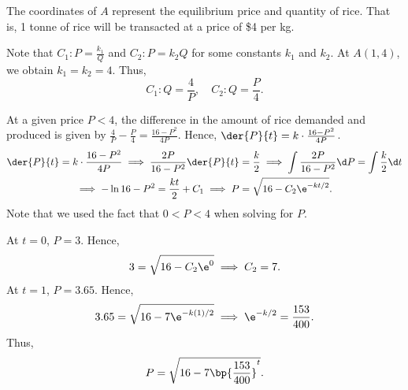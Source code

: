 \begin{solution}
    \begin{ppart}
        The coordinates of $A$ represent the equilibrium price and quantity of rice. That is, 1 tonne of rice will be transacted at a price of \$4 per kg.
    \end{ppart}
    \begin{ppart}
        Note that $C_1: P = \frac{k_1}{Q}$ and $C_2: P = k_2 Q$ for some constants $k_1$ and $k_2$. At $A(1, 4)$, we obtain $k_1 = k_2 = 4$. Thus, \[C_1 : Q = \frac4P, \quad C_2 : Q = \frac{P}{4}.\]
    \end{ppart}
    \begin{ppart}
        At a given price $P < 4$, the difference in the amount of rice demanded and produced is given by $\frac{4}{P} - \frac{P}{4} = \frac{16 - P^2}{4P}$. Hence, $\der{P}{t} = k \cdot \frac{16 - P^2}{4P}$.
        \begin{gather*}
            \der{P}{t} = k \cdot \frac{16 - P^2}{4P} \implies \frac{2P}{16 - P^2} \der{P}{t} = \frac{k}2 \implies\int \frac{2P}{16 - P^2} \d P = \int \frac{k}2 \d t \\
            \implies -\ln{16 - P^2} = \frac{kt}{2} + C_1 \implies P = \sqrt{16 - C_2 \e^{-kt/2}}.
        \end{gather*}
        Note that we used the fact that $0 < P < 4$ when solving for $P$.

        At $t = 0$, $P = 3$. Hence, \[3 = \sqrt{16 - C_2 \e^0} \implies C_2 = 7.\] At $t = 1$, $P = 3.65$. Hence, \[3.65 = \sqrt{16 - 7\e^{-k(1)/2}} \implies \e^{-k/2} = \frac{153}{400}.\] Thus, \[P = \sqrt{16 - 7 \bp{\frac{153}{400}}^t}.\]

        \begin{center}
\end{center}
\end{ppart}
\end{solution}
